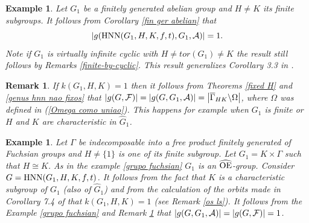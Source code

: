 \documentclass[a4paper,12pt]{article}
\newtheorem{cor}[thm]{Corollary}
\newcommand{\A}{{\cal A}}
\newcommand{\Oe}{\rm \widehat{OE}}
\newcommand{\B}{{\cal B}}
\newcommand{\F}{{\cal F}}
\def\hnn {{\rm HNN}}
\newtheorem{exa}[thm]{Example}
\newtheorem{rem}[thm]{Remark}
\begin{document}
{%







\begin{exa} Let $G_1$ be a finitely generated abelian group and $H\neq K$ its finite subgroups. It follows from Corollary \ref{fin ger abelian} that 
 $$|g(\hnn(G_1, H, K, f, t), G_1,  \mathcal{A})|=1.$$ Note if $G_1$ is virtually infinite cyclic with $H \neq tor(G_1) \neq K$ the result still follows by Remarks \ref{finite-by-cyclic}. 
 This result generalizes Corollary 3.3 in \cite{BZ}. 
\end{exa} 


\begin{rem} \label{ki finitos}
If $k(G_1,H,K)=1$ then it follows from Theorems \ref{fixed H} and \ref{genus hnn nao fixos} that $|g(G, \F)|=|g(G, G_1,\A)|=\left|\overline{\Gamma}_{HK}  \backslash  \Omega  \right|$, where $\Omega$ was defined in (\ref{Omega como uniao}). This happens for example when  $G_1$ is finite or $H$ and $K$ are characteristic in $\widehat G_1$. 
\end{rem} 


\begin{exa} \label{usar genus class A}
 Let $\Gamma$ be indecomposable into a free product finitely generated of Fuchsian groups and $H \neq \{1\}$ is one of its finite subgroup. Let $G_1=K\times \Gamma$ such that $H \cong K$. As in the example \ref{grupo fuchsian} $G_1$ is an $\Oe$-group. Consider $G=\hnn(G_1,H, K, f, t)$. It follows from the fact that $K$ is a  characteristic subgroup of $G_1$ (also of $\widehat{G}_1$) and from the calculation of the orbits made in Corollary 7.4 of \cite{BPZ2} that $k(G_1,H,K)=1$ (see Remark \ref{os ls}). It follows from the Example \ref{grupo fuchsian} and Remark \ref{ki finitos} that $|g(G, G_1,\A)|=|g(G, \F)|=1$. 
\end{exa}

}
\end{document}
